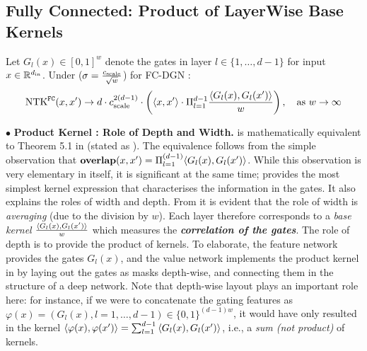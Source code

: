 %
\subsection{Fully Connected: Product of LayerWise Base Kernels}
\begin{theorem}
\label{th:fc} Let $G_l(x)\in[0,1]^w$ denote the gates in layer $l\in\{1,\ldots,d-1\}$ for input $x\in\mathbb{R}^{d_{\text{in}}}$. Under   ($\sigma=\frac{c_{\text{scale}}}{\sqrt{w}}$) for FC-DGN : 
\begin{align*}
\text{NTK}^{\texttt{FC}}(x,x') \rightarrow d \cdot c_{\text{scale}}^{2(d-1)} \cdot \left(\langle  x,x'\rangle \cdot \Pi_{l=1}^{d-1} \frac{\langle G_l(x),G_l(x')\rangle}w\right), \quad\text{as}\,\, w\rightarrow \infty 
\end{align*}
\end{theorem} 
$\bullet$ \textbf{Product Kernel : Role of Depth and Width.}  is mathematically equivalent to Theorem 5.1 in \citep{npk} (stated as ). The equivalence follows from the simple observation that $\textbf{overlap}(x,x')=\Pi_{l=1}^{(d-1)}\langle G_l(x),G_l(x')\rangle$. While this observation is very elementary in itself, it is significant at the same time;   provides the most simplest kernel expression that characterises the information in the gates. It also explains the roles of width and depth.  From  it is evident that the role of width is \emph{averaging} (due to the division by $w$). Each layer therefore corresponds to a \emph{base kernel} $\frac{\langle G_l(x),G_l(x')\rangle}w$ which measures the \emph{\textbf{correlation of the gates}}. The role of depth is to provide the product of kernels. To elaborate, the feature network provides the gates $G_l(x)$, and the value network implements the product kernel in  by laying out the gates as masks depth-wise, and connecting them in the structure of a deep network. Note that depth-wise layout plays an important role here: for instance, if we were to concatenate the gating features as $\varphi(x)=(G_l(x),l=1,\ldots,d-1)\in\{0,1\}^{(d-1)w}$, it would have only resulted in the kernel $\langle \varphi(x),\varphi(x')\rangle=\sum_{l=1}^{d-1}{\langle G_l(x),G_l(x')\rangle}$, i.e., a \emph{sum  (not product)} of kernels. 

